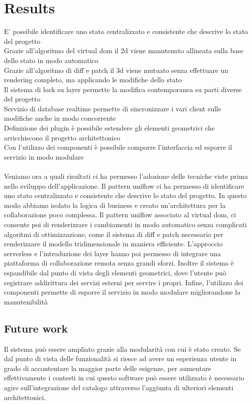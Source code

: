 \section{Results}


E' possibile identificare uno stato centralizzato e consistente che descrive lo stato del progetto\\
Grazie all'algoritmo del virtual dom il 2d viene manutenuto allineata sulla base dello stato in modo automatico\\
Grazie all'algoritmo di diff e patch il 3d viene mutuato senza effettuare un rendering completo, ma applicando le modifiche dello stato\\
Il sistema di lock su layer permette la modifica contemporanea su parti diverse del progetto\\
Servizio di database realtime permette di sincronizzare i vari client sulle modifiche anche in modo concorrente\\
Definizione dei plugin \`e possibile estendere gli elementi geometrici che arricchiscono il progetto architettonico\\
Con l'utilizzo dei componenti \`e possibile comporre l'interfaccia ed esporre il servizio in modo modulare\\\\


Veniamo ora a quali risultati ci ha permesso l'adozione delle tecniche viste prima nello sviluppo dell'applicazione. Il pattern uniflow ci ha permesso di identificare uno stato centralizzato e consistente che descrive lo stato del progetto. In questo modo abbiamo isolato la logica di business e creato un'architettura per la collaborazione poco complessa. Il pattern uniflow associato al virtual dom, ci consente poi di renderizzare i cambiamenti in modo automatico senza complicati algoritmi di ottimizzazione, come il sistema di diff e patch necessario per renderizzare il modello tridimensionale in maniera efficiente. L'approccio serverless e l'introduzione dei layer hanno poi permesso di integrare una piattaforma di collaborazione remota senza grandi sforzi. Inoltre il sistema è espandibile dal punto di vista degli elementi geometrici, dove l'utente pu\`o registrare addirittura dei servizi esterni per servire i propri. Infine, l'utilizzo dei componenti permette di esporre il servizio in modo modulare migliorandone la manutenibilit\`a



\subsection{Future work}
Il sistema pu\`o essere ampliato grazie alla modularit\`a con cui \`e stato creato. Se dal punto di vista delle funzionalit\`a si riesce ad avere un esperienza utente in grado di accontentare la maggior parte delle esigenze, per aumentare effettivamente i contesti in cui questo software pu\`o essere utilizzato \`e necessario agire sull'integrazione del catalogo attraverso l'aggiunta di ulteriori elementi architettonici.